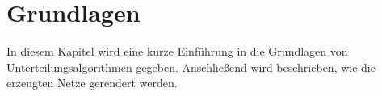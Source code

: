 \chapter{Grundlagen}

In diesem Kapitel wird eine kurze Einführung in die Grundlagen von Unterteilungsalgorithmen gegeben.
Anschließend wird beschrieben, wie die erzeugten Netze gerendert werden.



\newpage


